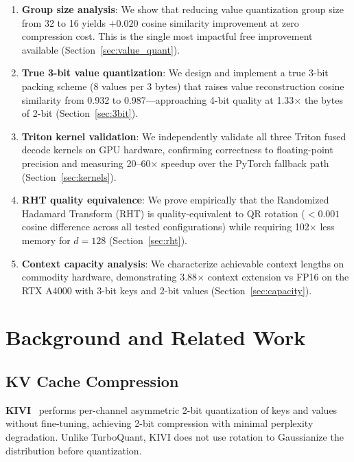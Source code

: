 \documentclass[10pt,twocolumn]{article}
\begin{document}
\begin{enumerate}
\item \textbf{Group size analysis}: We show that reducing value quantization group size from 32 to 16 yields $+0.020$ cosine similarity improvement at zero compression cost. This is the single most impactful free improvement available (Section~\ref{sec:value_quant}).

\item \textbf{True 3-bit value quantization}: We design and implement a true 3-bit packing scheme (8 values per 3 bytes) that raises value reconstruction cosine similarity from 0.932 to 0.987—approaching 4-bit quality at 1.33$\times$ the bytes of 2-bit (Section~\ref{sec:3bit}).

\item \textbf{Triton kernel validation}: We independently validate all three Triton fused decode kernels on GPU hardware, confirming correctness to floating-point precision and measuring 20--60$\times$ speedup over the PyTorch fallback path (Section~\ref{sec:kernels}).

\item \textbf{RHT quality equivalence}: We prove empirically that the Randomized Hadamard Transform (RHT) is quality-equivalent to QR rotation ($< 0.001$ cosine difference across all tested configurations) while requiring 102$\times$ less memory for $d = 128$ (Section~\ref{sec:rht}).

\item \textbf{Context capacity analysis}: We characterize achievable context lengths on commodity hardware, demonstrating 3.88$\times$ context extension vs FP16 on the RTX A4000 with 3-bit keys and 2-bit values (Section~\ref{sec:capacity}).
\end{enumerate}

\section{Background and Related Work}
\label{sec:background}

\subsection{KV Cache Compression}

\textbf{KIVI}~\cite{liu2024kivi} performs per-channel asymmetric 2-bit quantization of keys and values without fine-tuning, achieving 2-bit compression with minimal perplexity degradation. Unlike TurboQuant, KIVI does not use rotation to Gaussianize the distribution before quantization.
\end{document}
